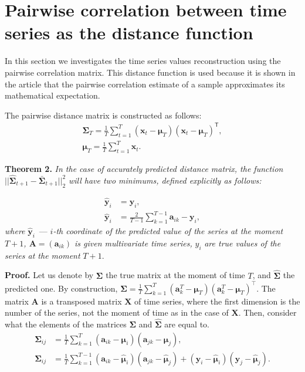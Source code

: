\documentclass{article}
\begin{document}
\section{Pairwise correlation between time series as the distance function}

In this section we investigates the time series values reconstruction using the pairwise correlation matrix. This distance function is used because it is shown in the article \cite{puchkin2023sharper} that the pairwise correlation estimate of a sample approximates its mathematical expectation.

The pairwise distance matrix is constructed as follows:
\begin{gather*}
	{\mathbf{\Sigma}}_T = \frac{1}{T} \sum_{t=1}^{T} (\mathbf{x}_t - \boldsymbol{\mu}_T)(\mathbf{x}_t - \boldsymbol{\mu}_T)^\mathsf{T},\\
	\boldsymbol{\mu}_T = \frac{1}{T} \sum_{t=1}^{T} \mathbf{x}_t.
\end{gather*}

\textbf{Theorem 2.} \textit{In the case of accurately predicted distance matrix, the function} $||\hat{\mathbf{\Sigma}}_{t+1} - \bar{\mathbf{\Sigma}}_{t+1}||_2^2$ \textit{will have two minimums, defined explicitly as follows:}

\begin{align*}
	\hat{\mathbf{y}}_i &= \mathbf{y}_i,\\
	\hat{\mathbf{y}}_i &= \frac{2}{T-1} \sum_{k=1}^{T-1} \mathbf{a}_{ik} - \mathbf{y}_i,
\end{align*}
\textit{where} $\hat{\mathbf{y}}_i$~--- $i$\textit{-th coordinate of the predicted value of the series at the moment $T+1$, $\mathbf{A}=(\mathbf{a}_{ik})$ is given multivariate time series,} $y_i$ \textit{are true values of the series at the moment} $T+1$.

\textbf{Proof.} Let us denote by $\mathbf{\Sigma}$ the true matrix at the moment of time $T$, and $\hat{\mathbf{\Sigma}}$ the predicted one. By construction, ${\mathbf{\Sigma}} = \frac{1}{T} \sum_{k=1}^{T} (\mathbf{a}^T_k - \boldsymbol{\mu}_T)(\mathbf{a}^T_k - \boldsymbol{\mu}_T)^\intercal\texttt{}$. The matrix $\mathbf{A}$ is a transposed matrix $\mathbf{X}$ of time series, where the first dimension is the number of the series, not the moment of time as in the case of $\mathbf{X}$. Then, consider what the elements of the matrices $\mathbf{\Sigma}$ and $\hat{\mathbf{\Sigma}}$ are equal to.
\begin{align*}
	\mathbf{\Sigma}_{ij} &= \frac{1}{T}\sum_{k=1}^{T}(\mathbf{a}_{ik} - \boldsymbol{\mu}_i)(\mathbf{a}_{jk}-\boldsymbol{\mu}_j),\\
	\hat{\mathbf{\Sigma}}_{ij} &= \frac{1}{T}\sum_{k=1}^{T-1}(\mathbf{a}_{ik} - \hat{\boldsymbol{\mu}}_i)(\mathbf{a}_{jk}-\hat{\boldsymbol{\mu}}_j) + (\mathbf{y}_i - \hat{\boldsymbol{\mu}}_i)(\mathbf{y}_j - \hat{\boldsymbol{\mu}}_j).
\end{align*}
\end{document}
